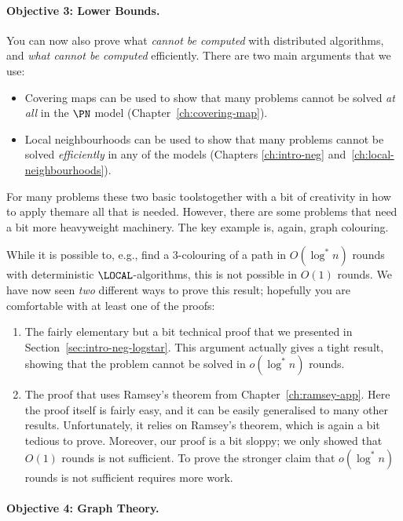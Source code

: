 \paragraph{Objective 3: Lower Bounds.}

You can now also prove what \emph{cannot be computed} with distributed algorithms, and \emph{what cannot be computed} efficiently. There are two main arguments that we use:
\begin{itemize}
    \item Covering maps can be used to show that many problems cannot be solved \emph{at all} in the $\PN$ model (Chapter~\ref{ch:covering-map}).
    \item Local neighbourhoods can be used to show that many problems cannot be solved \emph{efficiently} in any of the models (Chapters \ref{ch:intro-neg} and~\ref{ch:local-neighbourhoods}).
\end{itemize}
For many problems these two basic tools\mydash together with a bit of creativity in how to apply them\mydash are all that is needed. However, there are some problems that need a bit more heavyweight machinery. The key example is, again, graph colouring.

While it is possible to, e.g., find a $3$-colouring of a path in $O(\log^* n)$ rounds with deterministic $\LOCAL$-algorithms, this is not possible in $O(1)$ rounds. We have now seen \emph{two} different ways to prove this result; hopefully you are comfortable with at least one of the proofs:
\begin{enumerate}
    \item The fairly elementary but a bit technical proof that we presented in Section~\ref{sec:intro-neg-logstar}. This argument actually gives a tight result, showing that the problem cannot be solved in $o(\log^* n)$ rounds.
    \item The proof that uses Ramsey's theorem from Chapter~\ref{ch:ramsey-app}. Here the proof itself is fairly easy, and it can be easily generalised to many other results. Unfortunately, it relies on Ramsey's theorem, which is again a bit tedious to prove. Moreover, our proof is a bit sloppy; we only showed that $O(1)$ rounds is not sufficient. To prove the stronger claim that $o(\log^* n)$ rounds is not sufficient requires more work.
\end{enumerate}


\paragraph{Objective 4: Graph Theory.}

